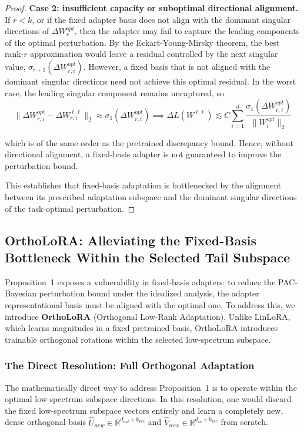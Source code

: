 \begin{proof}
\textbf{Case 2: insufficient capacity or suboptimal directional alignment.} If $r < k$, or if the fixed adapter basis does not align with the dominant singular directions of $\Delta W_r^{opt}$, then the adapter may fail to capture the leading components of the optimal perturbation. By the Eckart-Young-Mirsky theorem, the best rank-$r$ approximation would leave a residual controlled by the next singular value, $\sigma_{r+1}(\Delta W_{r,i}^{opt})$. However, a fixed basis that is not aligned with the dominant singular directions need not achieve this optimal residual. In the worst case, the leading singular component remains uncaptured, so
\[
\|\Delta W_{r,i}^{opt} - \Delta W_{r,i}^{\ell \ell}\|_2
\approx
\sigma_1(\Delta W_{r,i}^{opt})
\implies
\Delta L(W^{\ell \ell})
\lesssim
C
\sum_{i=1}^{d}
\frac{\sigma_1(\Delta W_{r,i}^{opt})}{\|W_i^{opt}\|_2}
\]

which is of the same order as the pretrained discrepancy bound. Hence, without directional alignment, a fixed-basis adapter is not guaranteed to improve the perturbation bound.

This establishes that fixed-basis adaptation is bottlenecked by the alignment between its prescribed adaptation subspace and the dominant singular directions of the task-optimal perturbation.
\end{proof}

\subsection{OrthoLoRA: Alleviating the Fixed-Basis Bottleneck Within the Selected Tail Subspace}\label{sec}

Proposition~1 exposes a vulnerability in fixed-basis adapters: to reduce the PAC-Bayesian perturbation bound under the idealized analysis, the adapter representational basis must be aligned with the optimal one. To address this, we introduce \textbf{OrthoLoRA} (Orthogonal Low-Rank Adaptation). Unlike LinLoRA, which learns magnitudes in a fixed pretrained basis, OrthoLoRA introduces trainable orthogonal rotations within the selected low-spectrum subspace.

\subsubsection{The Direct Resolution: Full Orthogonal Adaptation}

The mathematically direct way to address Proposition~1 is to operate within the optimal low-spectrum subspace directions. In this resolution, one would discard the fixed low-spectrum subspace vectors entirely and learn a completely new, dense orthogonal basis $\hat{U}_{new} \in \mathbb{R}^{d_{out} \times k_{vec}}$ and $\hat{V}_{new} \in \mathbb{R}^{d_{in} \times k_{vec}}$ from scratch.

